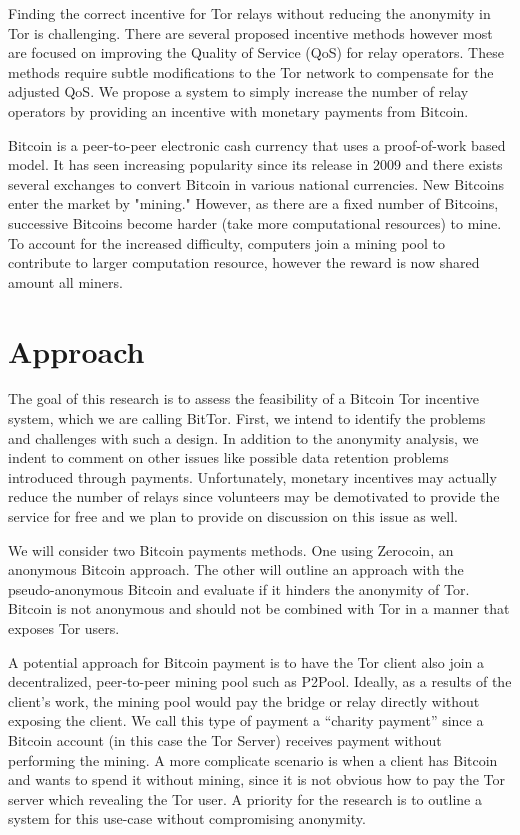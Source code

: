 \documentclass[letterpaper]{article}
\begin{document}
Finding the correct incentive for Tor relays without reducing the
anonymity in Tor is challenging.  There are several proposed incentive
methods however most are focused on improving the Quality of Service
(QoS) for relay operators.  These methods require subtle modifications
to the Tor network to compensate for the adjusted QoS.  We propose a
system to simply increase the number of relay operators by providing
an incentive with monetary payments from Bitcoin.

Bitcoin is a peer-to-peer electronic cash currency that uses a
proof-of-work based model\cite{nakamoto2009bitcoin}.  It has seen
increasing popularity since its release in 2009 and there exists
several exchanges to convert Bitcoin in various national currencies.
New Bitcoins enter the market by "mining."  However, as there are a
fixed number of Bitcoins, successive Bitcoins become harder (take more
computational resources) to mine.  To account for the increased
difficulty, computers join a mining
pool\cite{DBLP:journals/corr/abs-1112-4980} to contribute to larger
computation resource, however the reward is now shared amount all
miners.


\section*{Approach}\label{sec:approach}

The goal of this research is to assess the feasibility of a Bitcoin
Tor incentive system, which we are calling BitTor.  First, we intend
to identify the problems and challenges with such a design.  In
addition to the anonymity analysis, we indent to comment on other
issues like possible data retention problems introduced through
payments\cite{data-retention}.  Unfortunately, monetary incentives may
actually reduce the number of relays since volunteers may be
demotivated to provide the service for
free\cite{RePEc:eee:joepsy:v:30:y:2009:i:3:p:500-508} and we plan to
provide on discussion on this issue as well.


We will consider two Bitcoin payments
methods.  One using Zerocoin\cite{Miers:2013:ZAD:2497621.2498124}, an
anonymous Bitcoin approach.  The other will outline an approach with
the pseudo-anonymous Bitcoin and evaluate if it hinders the anonymity
of Tor.  Bitcoin is not anonymous\cite{journals/iacr/AndroulakiKRSC12}
and should not be combined with Tor in a manner that exposes Tor users.

A potential approach for Bitcoin payment is to have the Tor client
also join a decentralized, peer-to-peer mining pool such as P2Pool.
Ideally, as a results of the client's work, the mining pool would pay
the bridge or relay directly without exposing the client.  We call
this type of payment a ``charity payment'' since a Bitcoin account (in
this case the Tor Server) receives payment without performing the
mining.  A more complicate scenario is when a client has Bitcoin and
wants to spend it without mining, since it is not obvious how to pay
the Tor server which revealing the Tor user.  A priority for the
research is to outline a system for this use-case without compromising
anonymity.
\end{document}

